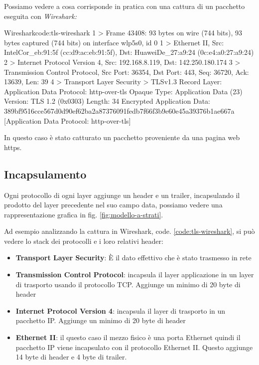 Possiamo vedere a cosa corrisponde in pratica con una cattura di un pacchetto eseguita con \it{Wireshark}:

\begin{bashcode}{Wireshark}{code:tls-wireshark}
1 > Frame 43408: 93 bytes on wire (744 bits), 93 bytes captured (744 bits) on interface wlp5s0, id 0
1 > Ethernet II, Src: IntelCor_eb:91:5f (cc:d9:ac:eb:91:5f), Dst: HuaweiDe_27:a9:24 (0c:e4:a0:27:a9:24)
2 > Internet Protocol Version 4, Src: 192.168.8.119, Dst: 142.250.180.174
3 > Transmission Control Protocol, Src Port: 36354, Dst Port: 443, Seq: 36720, Ack: 13639, Len: 39
4 > Transport Layer Security
> TLSv1.3 Record Layer: Application Data Protocol: http-over-tls
Opaque Type: Application Data (23)
Version: TLS 1.2 (0x0303)
Length: 34
Encrypted Application Data: 389bf9516cce567d0d90ef62ba2a87376091fedb7f66f3b9e60e45a39376b1ae667a
    [Application Data Protocol: http-over-tls]
\end{bashcode}

In questo caso è stato catturato un pacchetto proveniente da una pagina web https.

\subsection{Incapsulamento}

Ogni protocollo di ogni layer aggiunge un header e un trailer, incapsulando il prodotto del layer precedente nel suo campo data, possiamo vedere una rappresentazione grafica in fig. \ref{fig:modello-a-strati}.

Ad esempio analizzando la cattura in Wireshark, code. \ref{code:tls-wireshark}, si può vedere lo stack dei protocolli e i loro relativi header:

\begin{itemize}
    \item \textbf{Transport Layer Security}\cite{RFC_8446}: È il dato effettivo che è stato trasmesso in rete

    \item \textbf{Transmission Control Protocol}\cite{RFC_0793}: incapsula il layer applicazione in un layer di trasporto usando il protocollo TCP. Aggiunge un minimo di 20 byte di header

    \item \textbf{Internet Protocol Version 4}\cite{RFC_0791}: incapsula il layer di trasporto in un pacchetto IP. Aggiunge un minimo di 20 byte di header

    \item \textbf{Ethernet II}\cite{ethernet-ii}: il questo caso il mezzo fisico è una porta Ethernet quindi il pacchetto IP viene incapsulato con il protocollo Ethernet II. Questo aggiunge 14 byte di header e 4 byte di trailer.
\end{itemize}

